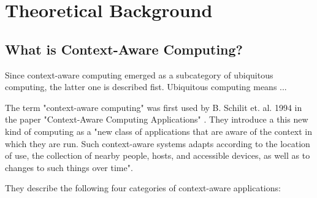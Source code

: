 
\chapter{Theoretical Background}


\section{What is Context-Aware Computing?}

Since context-aware computing emerged as a subcategory of ubiquitous computing, the latter one is described fist.
Ubiquitous computing means ...
  

The term "context-aware computing" was first used by B. Schilit et. al. 1994 in the paper "Context-Aware Computing Applications" \cite{Schilit94context-awarecomputing}. They introduce a this new kind of computing as a "new class of applications that are aware of the context in which they are run. Such context-aware systems adapts according to the location of use, the collection of nearby people, hosts, and accessible devices, as well as to changes to such things over time".

They describe the following four categories of context-aware applications:

